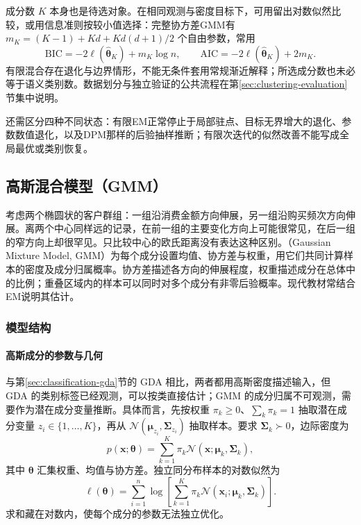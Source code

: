 成分数 $K$ 本身也是待选对象。在相同观测与密度目标下，可用留出对数似然比较，或用信息准则按较小值选择：完整协方差GMM有 $m_K=(K-1)+Kd+Kd(d+1)/2$ 个自由参数，常用
\begin{equation}
 \mathrm{BIC}=-2\ell(\hat{\bm\theta}_K)+m_K\log n,
 \qquad \mathrm{AIC}=-2\ell(\hat{\bm\theta}_K)+2m_K.
 \label{eq:clustering-bic}
\end{equation}
有限混合存在退化与边界情形，不能无条件套用常规渐近解释；所选成分数也未必等于语义类别数。数据划分与独立验证的公共流程在第\ref{sec:clustering-evaluation}节集中说明。

还需区分四种不同状态：有限EM正常停止于局部驻点、目标无界增大的退化、参数数值退化，以及DPM那样的后验抽样推断；有限次迭代的似然改善不能写成全局最优或类别恢复。

\subsection{高斯混合模型（GMM）}
\label{sec:clustering-gmm}

考虑两个椭圆状的客户群组：一组沿消费金额方向伸展，另一组沿购买频次方向伸展。离两个中心同样远的记录，在前一组的主要变化方向上可能很常见，在后一组的窄方向上却很罕见。只比较中心的欧氏距离没有表达这种区别。（Gaussian Mixture Model, GMM）为每个成分设置均值、协方差与权重，用它们共同计算样本的密度及成分归属概率。协方差描述各方向的伸展程度，权重描述成分在总体中的比例；重叠区域内的样本可以同时对多个成分有非零后验概率。现代教材常结合EM说明其估计。

\subsubsection{模型结构}

\paragraph{高斯成分的参数与几何}

与第\ref{sec:classification-gda}节的 GDA 相比，两者都用高斯密度描述输入，但 GDA 的类别标签已经观测，可以按类直接估计；GMM 的成分归属不可观测，需要作为潜在成分变量推断。具体而言，先按权重 $\pi_k\geq0$、$\sum_k\pi_k=1$ 抽取潜在成分变量 $z_i\in\{1,\ldots,K\}$，再从 $\mathcal{N}(\bm{\mu}_{z_i},\bm{\Sigma}_{z_i})$ 抽取样本。要求 $\bm{\Sigma}_k\succ0$，边际密度为
\begin{equation}
 p(\bm{x};\bm{\theta})
 =\sum_{k=1}^K\pi_k
   \mathcal{N}(\bm{x};\bm{\mu}_k,\bm{\Sigma}_k),
 \label{eq:clustering-gmm}
\end{equation}
其中 $\bm{\theta}$ 汇集权重、均值与协方差。独立同分布样本的对数似然为
\[
 \ell(\bm{\theta})
 =\sum_{i=1}^n\log\left[
 \sum_{k=1}^K\pi_k
 \mathcal{N}(\bm{x}_i;\bm{\mu}_k,\bm{\Sigma}_k)\right].
\]
求和藏在对数内，使每个成分的参数无法独立优化。

